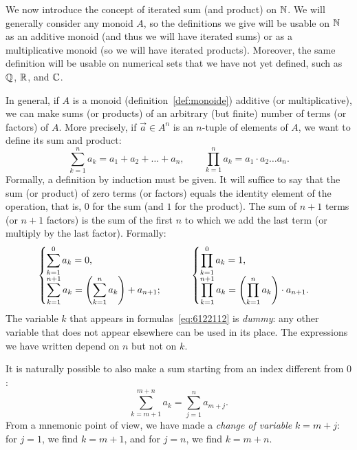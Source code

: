 We now introduce the concept of iterated sum (and product) on ${\mathbb N}$.
We will generally consider any monoid $A$, so 
the definitions we give will be usable on ${\mathbb N}$ 
as an additive monoid (and thus we will have iterated sums)
or as a multiplicative monoid (so we will have iterated products).
Moreover, the same definition will be usable 
on numerical sets that we have not yet defined, such as 
${\mathbb Q}$, ${\mathbb R}$, and ${\mathbb C}$.

In general, if $A$ is a monoid (definition~\ref{def:monoide}) additive 
(or multiplicative), we can make sums (or products) of an arbitrary 
(but finite) number of terms (or factors) of $A$.
More precisely, if $\vec a \in A^n$ 
is an $n$-tuple of elements of $A$, 
we want to define its sum and product:
\begin{equation}\label{eq:6122112}
\sum_{k=1}^n a_k = a_1 + a_2 + \dots + a_n,
\qquad 
\prod_{k=1}^n a_k = a_1 \cdot a_2 \dots a_n.
\end{equation}
Formally, a definition by induction must be given. 
It will suffice to say that the sum (or product)
of zero terms (or factors) equals the identity element 
of the operation, that is, $0$ for the sum (and $1$ for the product).
The sum of $n+1$ terms (or $n+1$ factors) is the sum of the first $n$ 
to which we add the last term (or multiply by the last factor).
Formally:
\[
  \begin{cases}
    \displaystyle\sum_{k=1}^{0} a_k = 0, \\
    \displaystyle\sum_{k=1}^{n+1} a_k = {\left( \sum_{k=1}^{n} a_k \right)} + a_{n+1};
  \end{cases}  \qquad
  \begin{cases}
    \displaystyle\prod_{k=1}^{0} a_k = 1, \\
    \displaystyle\prod_{k=1}^{n+1} a_k = {\left( \prod_{k=1}^{n} a_k \right)} \cdot a_{n+1}.
  \end{cases}
\]
The variable $k$ that appears in formulas~\eqref{eq:6122112} is \emph{dummy}: 
any other variable that does not appear elsewhere can be used in its place.
The expressions we have written depend on $n$ but not on $k$.

It is naturally possible to also make a sum starting from an index 
different from $0$:
\[
  \sum_{k=m+1}^{m+n} a_k = \sum_{j=1}^{n} a_{m+j}.
\]
From a mnemonic point of view, we have made 
a \emph{change of variable} $k=m+j$:
for $j=1$, we find $k=m+1$, and for $j=n$, we find $k=m+n$.

